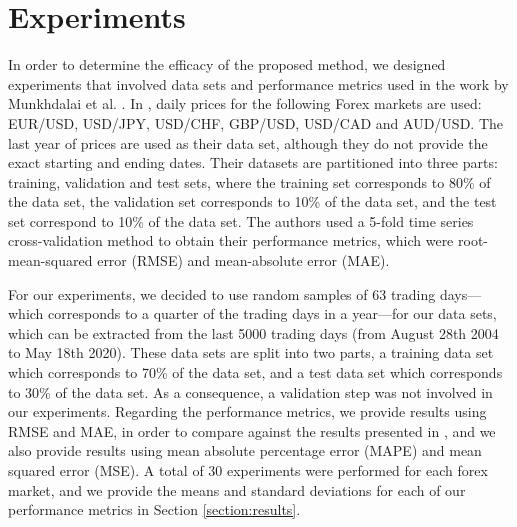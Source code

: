 \documentclass{ieeeaccess}
\begin{document}



\section{Experiments}
\label{section:experiments}

In order to determine the efficacy of the proposed method, we designed
experiments that involved data sets and performance metrics used in
the work by Munkhdalai et al. \cite{Munkhdalai2019}. In
\cite{Munkhdalai2019}, daily prices for the following Forex markets
are used: EUR/USD, USD/JPY, USD/CHF, GBP/USD, USD/CAD and AUD/USD. The last
year of prices are used as their data set, although they do not
provide the exact starting and ending dates. Their datasets are
partitioned into three parts: training, validation and test sets,
where the training set corresponds to 80\% of the data set, the
validation set corresponds to 10\% of the data set, and the test set
correspond to 10\% of the data set. The authors used a 5-fold time
series cross-validation method to obtain their performance metrics,
which were root-mean-squared error (RMSE) and mean-absolute error (MAE).

For our experiments, we decided to use random samples of 63 trading
days---which corresponds to a quarter of the trading days in a
year---for our data sets, which can be extracted from the last 5000
trading days (from August 28th 2004 to May 18th 2020). These data sets
are split into two parts, a training data set which corresponds to
70\% of the data set, and a test data set which corresponds to 30\% of
the data set. As a consequence, a validation step was not involved in
our experiments. Regarding the performance metrics, we provide results
using RMSE and MAE, in order to compare against the results presented
in \cite{Munkhdalai2019}, and we also provide results using mean
absolute percentage error (MAPE) and mean squared error (MSE). A total
of 30 experiments were performed for each forex market, and we provide
the means and standard deviations for each of our performance metrics
in Section \ref{section:results}.
\end{document}
